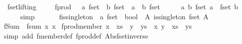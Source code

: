 \begin{isabellebody}
\isanewline
{}\isamarkupfalse%
\ \ fset{\isachardot}lifting\ \isanewline
\ \ \isamarkupfalse%
\ fprod\ \ {\isacharcolon}{\isacharcolon}\ {\isachardoublequoteopen}{\isacharprime}a\ fset\ {\isasymRightarrow}\ {\isacharprime}b\ fset\ {\isasymRightarrow}\ {\isacharparenleft}{\isacharprime}a\ {\isasymtimes}\ {\isacharprime}b{\isacharparenright}\ fset\ {\isachardoublequoteclose}\ {\isacharparenleft}\ {\isachardoublequoteopen}{\isacharbar}{\isasymtimes}{\isacharbar}{\isachardoublequoteclose}\ {}{}{\isacharparenright}\ \ {\isachardoublequoteopen}{\isasymlambda}a\ b{\isachardot}\ fset\ a\ {\isasymtimes}\ fset\ b{\isachardoublequoteclose}\isanewline
%
\isadelimproof
\ \ \ \ %
\endisadelimproof
%
\isatagproof
{}\isamarkupfalse%
\ simp%
\endisatagproof
{\isafoldproof}%
%
\isadelimproof
\isanewline
%
\endisadelimproof
\ \ \isanewline
\ \ \isamarkupfalse%
\ fis{\isacharunderscore}singleton\ {\isacharcolon}{\isacharcolon}\ {\isachardoublequoteopen}{\isacharprime}a\ fset\ {\isasymRightarrow}\ bool{\isachardoublequoteclose}\ \ {\isachardoublequoteopen}{\isasymlambda}A{\isachardot}\ is{\isacharunderscore}singleton\ {\isacharparenleft}fset\ A{\isacharparenright}{\isachardoublequoteclose}%
\isadelimproof
%
\endisadelimproof
%
\isatagproof
\isacommand{{\isachardot}}\isamarkupfalse%
%
\endisatagproof
{\isafoldproof}%
%
\isadelimproof
%
\endisadelimproof
\isanewline
{}\isamarkupfalse%
\isanewline
\isanewline
{}\isamarkupfalse%
\ {\isachardoublequoteopen}fSum\ {\isasymequiv}\ fsum\ {\isacharparenleft}{\isasymlambda}x{\isachardot}\ x{\isacharparenright}{\isachardoublequoteclose}\isanewline
\isanewline
{}\isamarkupfalse%
\ fprod{\isacharunderscore}member{\isacharcolon}\ {\isachardoublequoteopen}x\ {\isacharbar}{\isasymin}{\isacharbar}\ xs\ {\isasymLongrightarrow}\ y\ {\isacharbar}{\isasymin}{\isacharbar}\ ys\ {\isasymLongrightarrow}\ {\isacharparenleft}x{\isacharcomma}\ y{\isacharparenright}\ {\isacharbar}{\isasymin}{\isacharbar}\ xs\ {\isacharbar}{\isasymtimes}{\isacharbar}\ ys{\isachardoublequoteclose}\isanewline
%
\isadelimproof
\ \ %
\endisadelimproof
%
\isatagproof
{}\isamarkupfalse%
\ {\isacharparenleft}simp\ add{\isacharcolon}\ fmember{\isacharunderscore}def\ fprod{\isacharunderscore}def\ Abs{\isacharunderscore}fset{\isacharunderscore}inverse{\isacharparenright}%
\endisatagproof

\end{isabellebody}
